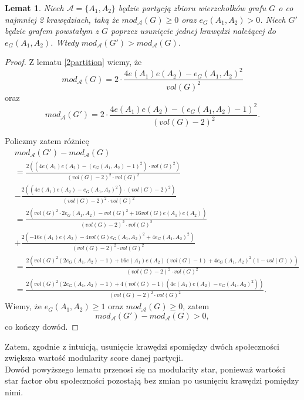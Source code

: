 \documentclass[letterpaper,12pt]{article}
\newtheorem{lemma}{Lemat}
\begin{document}
\begin{lemma}
  \label{delete_edge}
  Niech \(\mathcal{A}=\{A_1, A_2\}\) będzie partycją zbioru wierzchołków grafu \(G\) o co najmniej 2 krawędziach, taką że \(mod_{\mathcal{A}}(G) \geq 0\) oraz \(e_G(A_1, A_2) > 0\). Niech \(G'\) będzie grafem powstałym z \(G\) poprzez usunięcie jednej krawędzi należącej do \(e_G(A_1, A_2)\). Wtedy \(mod_{\mathcal{A}}(G') > mod_{\mathcal{A}}(G)\).
\end{lemma}
\begin{proof}
  Z lematu \ref{2partition} wiemy, że
  \[mod_{\mathcal{A}}(G) = 2 \cdot \frac{4e(A_1)e(A_2)-e_G(A_1,A_2)^2}{vol(G)^2}\]
  oraz
  \[mod_{\mathcal{A}}(G') = 2 \cdot \frac{4e(A_1)e(A_2)-(e_G(A_1,A_2)-1)^2}{(vol(G)-2)^2}.\]

  Policzmy zatem różnicę
  \begin{align*}
     & mod_{\mathcal{A}}(G') - mod_{\mathcal{A}}(G)                                                                                     \\
     & = \frac{2 \left(\left(4e(A_1)e(A_2)-(e_G(A_1,A_2)-1)^2\right)\cdot vol(G)^2 \right)}{(vol(G)-2)^2 \cdot vol(G)^2}                \\
     & - \frac{2 \left(\left(4e(A_1)e(A_2)-e_G(A_1,A_2)^2\right)\cdot (vol(G)-2)^2\right)}{(vol(G)-2)^2 \cdot vol(G)^2}                 \\
     & = \frac{2\left(vol(G)^2\cdot2e_G(A_1,A_2)-vol(G)^2+16vol(G)e(A_1)e(A_2)\right)}{(vol(G)-2)^2 \cdot vol(G)^2}                     \\
     & + \frac{2\left(-16e(A_1)e(A_2)-4vol(G)e_G(A_1,A_2)^2+4e_G(A_1,A_2)^2\right)}{(vol(G)-2)^2 \cdot vol(G)^2}                        \\
     & = \frac{2\left(vol(G)^2(2e_G(A_1,A_2)-1)+16e(A_1)e(A_2)(vol(G)-1)+4e_G(A_1,A_2)^2(1-vol(G))\right)}{(vol(G)-2)^2 \cdot vol(G)^2} \\
     & = \frac{2\left(vol(G)^2(2e_G(A_1,A_2)-1)+4(vol(G)-1)(4e(A_1)e(A_2)-e_G(A_1,A_2)^2)\right)}{(vol(G)-2)^2 \cdot vol(G)^2}.
  \end{align*}
  Wiemy, że \(e_G(A_1,A_2) \geq 1\) oraz \(mod_{\mathcal{A}}(G) \geq 0\), zatem
  \[mod_{\mathcal{A}}(G') - mod_{\mathcal{A}}(G) > 0,\]
  co kończy dowód.
\end{proof}

Zatem, zgodnie z intuicją, usunięcie krawędzi spomiędzy dwóch społeczności zwiększa wartość modularity score danej partycji.\\

Dowód powyższego lematu przenosi się na modularity star, ponieważ wartości star factor obu społeczności pozostają bez zmian po usunięciu krawędzi pomiędzy nimi.
\end{document}
